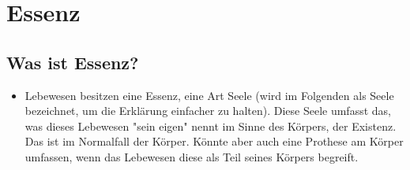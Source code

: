 \chapter{Essenz}
\section{Was ist Essenz?}
\begin{itemize}
	\item Lebewesen besitzen eine Essenz, eine Art Seele (wird im Folgenden als Seele bezeichnet, um die Erklärung einfacher zu halten). Diese Seele umfasst das, was dieses Lebewesen "sein eigen" nennt im Sinne des Körpers, der Existenz. Das ist im Normalfall der Körper. Könnte aber auch eine Prothese am Körper umfassen, wenn das Lebewesen diese als Teil seines Körpers begreift.
\end{itemize}